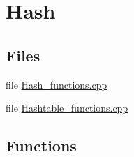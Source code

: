 \hypertarget{group__hash}{\section{Hash}
\label{group__hash}
}
\subsection*{Files}
\begin{DoxyCompactItemize}
\item 
file \hyperlink{Hash__functions_8cpp}{Hash\-\_\-functions.\-cpp}
\item 
file \hyperlink{Hashtable__functions_8cpp}{Hashtable\-\_\-functions.\-cpp}
\end{DoxyCompactItemize}
\subsection*{Functions}
